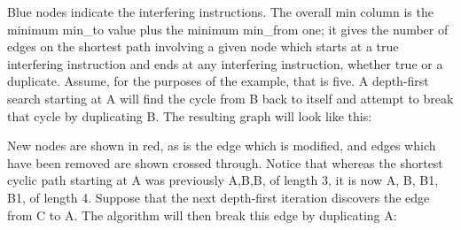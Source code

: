 
Blue nodes indicate the interfering instructions.  The overall min
column is the minimum min\_to value plus the minimum min\_from one; it
gives the number of edges on the shortest path involving a given node
which starts at a true interfering instruction and ends at any
interfering instruction, whether true or a duplicate.  Assume, for the
purposes of the example, that \backref{$\alpha$} is five.  A
depth-first search starting at A will find the cycle from B back to
itself and attempt to break that cycle by duplicating B.  The
resulting graph will look like this:


New nodes are shown in red, as is the edge which is modified, and
edges which have been removed are shown crossed through.  Notice that
whereas the shortest cyclic path starting at A was previously A,B,B,
of length 3, it is now A, B, B1, B1, of length 4.  Suppose that the
next depth-first iteration discovers the edge from C to A.  The
algorithm will then break this edge by duplicating A:

